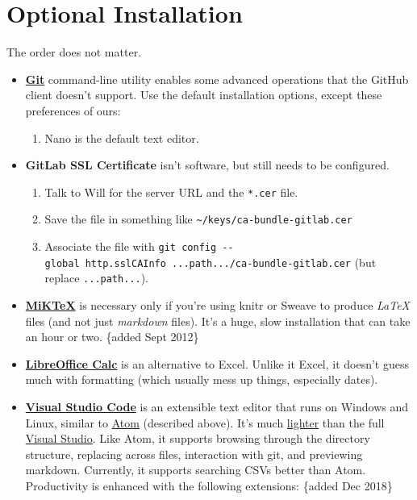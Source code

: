 \documentclass[
]{book}
\providecommand{\tightlist}{%
  \setlength{\itemsep}{0pt}\setlength{\parskip}{0pt}}
\begin{document}
\hypertarget{installation-optional}{%
\section{Optional Installation}\label{installation-optional}}

The order does not matter.

\begin{itemize}
\item
  \textbf{\href{https://git-scm.com/downloads}{Git}} command-line utility enables some advanced operations that the GitHub client doesn't support. Use the default installation options, except these preferences of ours:

  \begin{enumerate}
  \def\labelenumi{\arabic{enumi}.}
  \tightlist
  \item
    Nano is the default text editor.
  \end{enumerate}
\item
  \textbf{GitLab SSL Certificate} isn't software, but still needs to be configured.

  \begin{enumerate}
  \def\labelenumi{\arabic{enumi}.}
  \tightlist
  \item
    Talk to Will for the server URL and the \texttt{*.cer} file.
  \item
    Save the file in something like \texttt{\textasciitilde{}/keys/ca-bundle-gitlab.cer}
  \item
    Associate the file with \texttt{git\ config\ -\/-global\ http.sslCAInfo\ ...path.../ca-bundle-gitlab.cer} (but replace \texttt{...path...}).
  \end{enumerate}
\item
  \textbf{\href{http://miktex.org/}{MiKTeX}} is necessary only if you're using knitr or Sweave to produce \emph{LaTeX} files (and not just \emph{markdown} files). It's a huge, slow installation that can take an hour or two. \{added Sept 2012\}
\item
  \textbf{\href{https://www.libreoffice.org/discover/calc/}{LibreOffice Calc}} is an alternative to Excel. Unlike it Excel, it doesn't guess much with formatting (which usually mess up things, especially dates).
\item
  \textbf{\href{https://code.visualstudio.com/}{Visual Studio Code}} is an extensible text editor that runs on Windows and Linux, similar to \href{https://atom.io/}{Atom} (described above). It's much \href{https://stackoverflow.com/questions/30527522/what-are-the-differences-between-visual-studio-code-and-visual-studio}{lighter} than the full \href{https://visualstudio.microsoft.com/}{Visual Studio}. Like Atom, it supports browsing through the directory structure, replacing across files, interaction with git, and previewing markdown. Currently, it supports searching CSVs better than Atom. Productivity is enhanced with the following extensions: \{added Dec 2018\}


\end{itemize}
\end{document}
